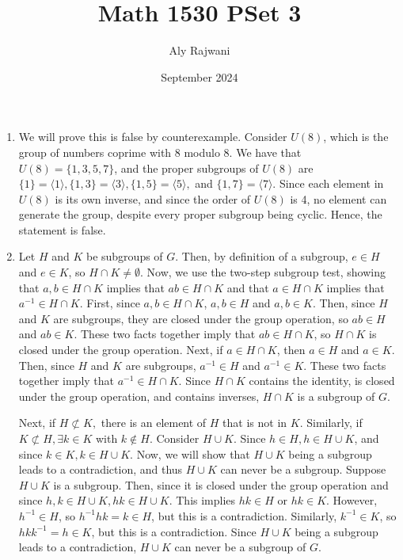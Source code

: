 \documentclass{article}
\title{Math 1530 PSet 3}
\author{Aly Rajwani}
\date{September 2024}
\begin{document}
\maketitle

\begin{enumerate}
    \item We will prove this is false by counterexample. Consider $U(8)$, which is the group of numbers coprime with 8 modulo 8. We have that $U(8) = \{1, 3, 5, 7\}$, and the proper subgroups of $U(8)$ are $\{1\} = \langle1\rangle, \{1, 3\} = \langle3\rangle, \{1, 5\} = \langle5\rangle,$ and $\{1, 7\} = \langle7\rangle$. Since each element in $U(8)$ is its own inverse, and since the order of $U(8)$ is 4, no element can generate the group, despite every proper subgroup being cyclic. Hence, the statement is false. 

    \item Let $H$ and $K$ be subgroups of $G$. Then, by definition of a subgroup, $e \in H$ and $e \in K$, so $H \cap K \neq \emptyset$. Now, we use the two-step subgroup test, showing that $a, b \in H\cap K$ implies that  $ab \in H\cap K$ and that $a \in H \cap K$ implies that $a^{-1} \in H \cap K$. First, since $a, b \in H \cap K$, $a, b \in H$ and $a, b \in K$. Then, since $H$ and $K$ are subgroups, they are closed under the group operation, so $ab \in H$ and $ab \in K$. These two facts together imply that $ab \in H \cap K$, so $H\cap K$ is closed under the group operation. Next, if $a \in H\cap K$, then $a \in H$ and $a \in K$. Then, since $H$ and $K$ are subgroups, $a^{-1} \in H$ and $a^{-1} \in K$. These two facts together imply that $a^{-1} \in H\cap K$. Since $H \cap K$ contains the identity, is closed under the group operation, and contains inverses, $H \cap K$ is a subgroup of $G$.

    \smallskip

    Next, if $H \not\subset K,$ there is an element of $H$ that is not in $K$. Similarly, if $K \not\subset H, \exists k \in K$ with $k \notin H$. Consider $H \cup K$. Since $h \in H, h \in H \cup K$, and since $k \in K, k \in H \cup K$. Now, we will show that $H \cup K$ being a subgroup leads to a contradiction, and thus $H \cup K$ can never be a subgroup. Suppose $H \cup K$ is a subgroup. Then, since it is closed under the group operation and since $h, k \in H \cup K, hk \in H \cup K$. This implies $hk \in H$ or $hk \in K$. However, $h^{-1} \in H$, so $h^{-1}hk = k \in H$, but this is a contradiction. Similarly, $k^{-1} \in K$, so $hkk^{-1} = h \in K$, but this is a contradiction. Since $H\cup K$ being a subgroup leads to a contradiction, $H \cup K$ can never be a subgroup of $G$. 


\end{enumerate}
\end{document}
